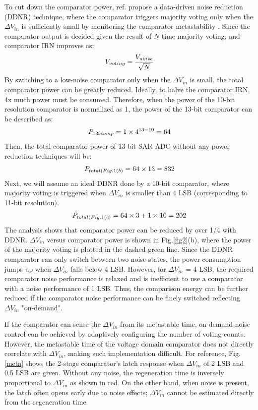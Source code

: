 \documentclass[journal]{IEEEtran}
\begin{document}
To cut down the comparator power, ref.\cite{harpe201310b} propose a data-driven noise reduction (DDNR) technique, where the comparator triggers majority voting only when the $\Delta V_{in}$ is sufficiently small by monitoring the comparator metastability \cite{shikata20120}. Since the comparator output is decided given the result of $N$ time majority voting, and comparator IRN improves as:
\begin{eqnarray}
    \centering
    V_{voting} = \frac{V_{noise}}{\sqrt{N}}
    \label{voting}
\end{eqnarray}
By switching to a low-noise comparator only when the $\Delta V_{in}$ is small, the total comparator power can be greatly reduced.
Ideally, to halve the comparator IRN, 4x much power must be consumed. Therefore, when the power of the 10-bit resolution comparator is normalized as 1, the power of the 13-bit comparator can be described as:
\begin{eqnarray}
    \centering
    P_{13bcomp} = 1 \times 4^{13-10} = 64
    \label{13b}
\end{eqnarray}
Then, the total comparator power of 13-bit SAR ADC without any power reduction techniques will be:
\begin{eqnarray}
    \centering
    P_{total(Fig.1(b)} = 64 \times 13 = 832
    \label{sar13b}
\end{eqnarray}
Next, we will assume an ideal DDNR done by a 10-bit comparator, where majority voting is triggered when $\Delta V_{in}$ is smaller than 4 LSB (corresponding to 11-bit resolution).
\begin{eqnarray}
    \centering
    P_{total(Fig.1(c)} = 64 \times 3 + 1 \times 10 = 202
    \label{ddnr}
\end{eqnarray}
The analysis shows that comparator power can be reduced by over 1/4 with DDNR. $\Delta V_{in}$ versus comparator power is shown in Fig.\ref{fig2}(b), where the power of the majority voting is plotted in the dashed green line. 
Since the DDNR comparator can only switch between two noise states, the power consumption jumps up when $\Delta V_{in}$ falls below 4 LSB. 
However, for $\Delta V_{in}$ = 4 LSB, the required comparator noise performance is relaxed and is inefficient to use a comparator with a noise performance of 1 LSB.
Thus, the comparison energy can be further reduced if the comparator noise performance can be finely switched reflecting $\Delta V_{in}$ "on-demand".

If the comparator can sense the $\Delta V_{in}$ from its metastable time, on-demand noise control can be achieved by adaptively configuring the number of voting counts.
However, the metastable time of the voltage domain comparator does not directly correlate with $\Delta V_{in}$, making such implementation difficult. For reference, Fig.\ref{meta} shows the 2-stage comparator's latch response when $\Delta V_{in}$ of 2 LSB and 0.5 LSB are given. Without any noise, the regeneration time is inversely proportional to $\Delta V_{in}$ as shown in red. On the other hand, when noise is present, the latch often opens early due to noise effects; $\Delta V_{in}$ cannot be estimated directly from the regeneration time.
\end{document}
